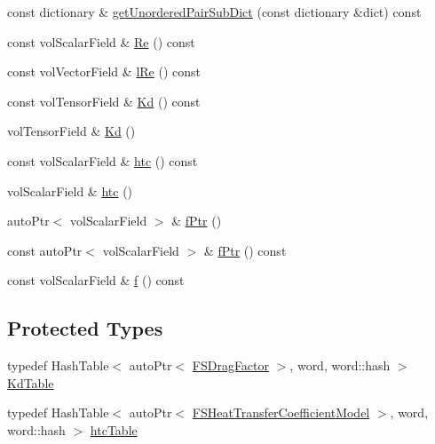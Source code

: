 \begin{DoxyCompactItemize}
const dictionary \& \hyperlink{classFoam_1_1FSPair_aefb871e3bdf791a96a332aade3f41c46}{get\+Unordered\+Pair\+Sub\+Dict} (const dictionary \&dict) const
\item 
const vol\+Scalar\+Field \& \hyperlink{classFoam_1_1FSPair_a657f374be896f550786309f405afb0fc}{Re} () const
\item 
const vol\+Vector\+Field \& \hyperlink{classFoam_1_1FSPair_ae094f672472da0348f88b10bd2f74034}{l\+Re} () const
\item 
const vol\+Tensor\+Field \& \hyperlink{classFoam_1_1FSPair_ae1101a93af09b95ea0044d0d2d49b478}{Kd} () const
\item 
vol\+Tensor\+Field \& \hyperlink{classFoam_1_1FSPair_a24eb8063209bb6de10d338991af11371}{Kd} ()
\item 
const vol\+Scalar\+Field \& \hyperlink{classFoam_1_1FSPair_af32101ce02f4467ce8810572a2f2359c}{htc} () const
\item 
vol\+Scalar\+Field \& \hyperlink{classFoam_1_1FSPair_a335e4e1a5b225f46d3d55a033dd721cc}{htc} ()
\item 
auto\+Ptr$<$ vol\+Scalar\+Field $>$ \& \hyperlink{classFoam_1_1FSPair_a72f7fba51d9407249d04ad802ab603a3}{f\+Ptr} ()
\item 
const auto\+Ptr$<$ vol\+Scalar\+Field $>$ \& \hyperlink{classFoam_1_1FSPair_ac567838bcee4bb606e5319d5d63a34b1}{f\+Ptr} () const
\item 
const vol\+Scalar\+Field \& \hyperlink{classFoam_1_1FSPair_a5df698b653c1d1c9d13ba87ec23125d5}{f} () const
\end{DoxyCompactItemize}
\subsection*{Protected Types}
\begin{DoxyCompactItemize}
\item 
typedef Hash\+Table$<$ auto\+Ptr$<$ \hyperlink{classFoam_1_1FSDragFactor}{F\+S\+Drag\+Factor} $>$, word, word\+::hash $>$ \hyperlink{classFoam_1_1FSPair_a9fff7443e03586fe1171f2b48bf43ac0}{Kd\+Table}
\item 
typedef Hash\+Table$<$ auto\+Ptr$<$ \hyperlink{classFoam_1_1FSHeatTransferCoefficientModel}{F\+S\+Heat\+Transfer\+Coefficient\+Model} $>$, word, word\+::hash $>$ \hyperlink{classFoam_1_1FSPair_afcdf367b12288044e3559dd3b09ea5d3}{htc\+Table}
\end{DoxyCompactItemize}
